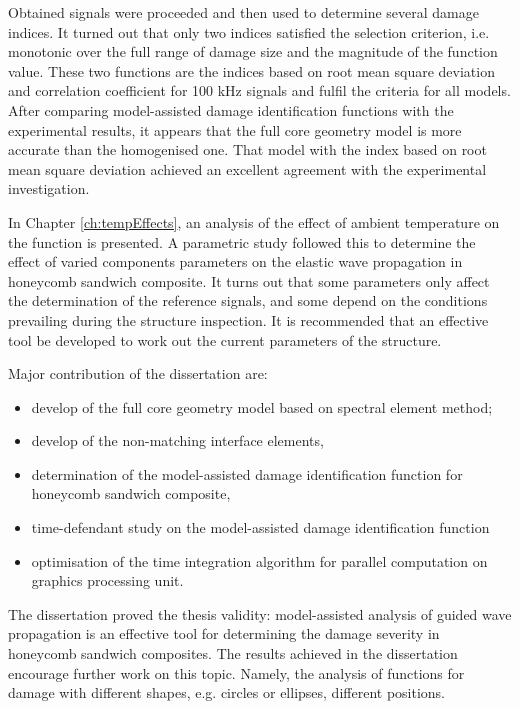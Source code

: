 Obtained signals were proceeded and then used to determine several damage indices.
It turned out that only two indices satisfied the selection criterion, i.e. monotonic over the full range of damage size and the magnitude of the function value.
These two functions are the indices based on root mean square deviation and correlation coefficient for 100 kHz signals and fulfil the criteria for all models.
After comparing model-assisted damage identification functions with the experimental results, it appears that the full core geometry model is more accurate than the homogenised one.
That model with the index based on root mean square deviation achieved an excellent agreement with the experimental investigation.

In Chapter \ref{ch:tempEffects}, an analysis of the effect of ambient temperature on the function is presented.
A parametric study followed this to determine the effect of varied components parameters on the elastic wave propagation in honeycomb sandwich composite. 
It turns out that some parameters only affect the determination of the reference signals, and some depend on the conditions prevailing during the structure inspection.
It is recommended that an effective tool be developed to work out the current parameters of the structure.

Major contribution of the dissertation are:
\begin{itemize}
	\item develop of the full core geometry model based on spectral element method;
	\item develop of the non-matching interface elements,
	\item determination of the model-assisted damage identification function for honeycomb sandwich composite,
	\item time-defendant study on the model-assisted damage identification function
	\item optimisation of the time integration algorithm for parallel computation on graphics processing unit.
\end{itemize}

The dissertation proved the thesis validity: model-assisted analysis of guided wave propagation is an effective tool for determining the damage severity in honeycomb sandwich composites.
The results achieved in the dissertation encourage further work on this topic.
Namely, the analysis of functions for damage with different shapes, e.g. circles or ellipses, different positions.
